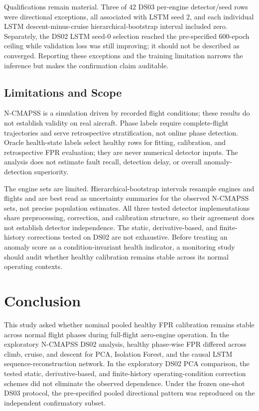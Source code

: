 \documentclass[10pt,conference]{IEEEtran}
\begin{document}
Qualifications remain material. Three of 42 DS03 per-engine detector/seed rows were directional exceptions, all associated with LSTM seed 2, and each individual LSTM descent-minus-cruise hierarchical-bootstrap interval included zero. Separately, the DS02 LSTM seed-0 selection reached the pre-specified 600-epoch ceiling while validation loss was still improving; it should not be described as converged. Reporting these exceptions and the training limitation narrows the inference but makes the confirmation claim auditable.

\subsection{Limitations and Scope}\label{limitations-and-scope}

N-CMAPSS is a simulation driven by recorded flight conditions; these results do not establish validity on real aircraft. Phase labels require complete-flight trajectories and serve retrospective stratification, not online phase detection. Oracle health-state labels select healthy rows for fitting, calibration, and retrospective FPR evaluation; they are never numerical detector inputs. The analysis does not estimate fault recall, detection delay, or overall anomaly-detection superiority.

The engine sets are limited. Hierarchical-bootstrap intervals resample engines and flights and are best read as uncertainty summaries for the observed N-CMAPSS sets, not precise population estimates. All three tested detector implementations share preprocessing, correction, and calibration structure, so their agreement does not establish detector independence. The static, derivative-based, and finite-history corrections tested on DS02 are not exhaustive. Before treating an anomaly score as a condition-invariant health indicator, a monitoring study should audit whether healthy calibration remains stable across its normal operating contexts.

\section{Conclusion}\label{conclusion}

This study asked whether nominal pooled healthy FPR calibration remains stable across normal flight phases during full-flight aero-engine operation. In the exploratory N-CMAPSS DS02 analysis, healthy phase-wise FPR differed across climb, cruise, and descent for PCA, Isolation Forest, and the causal LSTM sequence-reconstruction network. In the exploratory DS02 PCA comparison, the tested static, derivative-based, and finite-history operating-condition correction schemes did not eliminate the observed dependence. Under the frozen one-shot DS03 protocol, the pre-specified pooled directional pattern was reproduced on the independent confirmatory subset.
\end{document}
